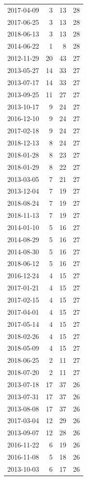 \begin{tabular}{lrrr}
2017-04-09 & 3 & 13 & 28 \\
2017-06-25 & 3 & 13 & 28 \\
2018-06-13 & 3 & 13 & 28 \\
2014-06-22 & 1 & 8 & 28 \\
2012-11-29 & 20 & 43 & 27 \\
2013-05-27 & 14 & 33 & 27 \\
2013-07-17 & 14 & 33 & 27 \\
2013-09-25 & 11 & 27 & 27 \\
2013-10-17 & 9 & 24 & 27 \\
2016-12-10 & 9 & 24 & 27 \\
2017-02-18 & 9 & 24 & 27 \\
2018-12-13 & 8 & 24 & 27 \\
2018-01-28 & 8 & 23 & 27 \\
2018-01-29 & 8 & 22 & 27 \\
2013-03-05 & 7 & 21 & 27 \\
2013-12-04 & 7 & 19 & 27 \\
2018-08-24 & 7 & 19 & 27 \\
2018-11-13 & 7 & 19 & 27 \\
2014-01-10 & 5 & 16 & 27 \\
2014-08-29 & 5 & 16 & 27 \\
2014-08-30 & 5 & 16 & 27 \\
2018-06-12 & 5 & 16 & 27 \\
2016-12-24 & 4 & 15 & 27 \\
2017-01-21 & 4 & 15 & 27 \\
2017-02-15 & 4 & 15 & 27 \\
2017-04-01 & 4 & 15 & 27 \\
2017-05-14 & 4 & 15 & 27 \\
2018-02-26 & 4 & 15 & 27 \\
2018-05-09 & 4 & 15 & 27 \\
2018-06-25 & 2 & 11 & 27 \\
2018-07-20 & 2 & 11 & 27 \\
2013-07-18 & 17 & 37 & 26 \\
2013-07-31 & 17 & 37 & 26 \\
2013-08-08 & 17 & 37 & 26 \\
2017-03-04 & 12 & 29 & 26 \\
2013-09-07 & 12 & 28 & 26 \\
2016-11-22 & 6 & 19 & 26 \\
2016-11-08 & 5 & 18 & 26 \\
2013-10-03 & 6 & 17 & 26 \\

\end{tabular}
